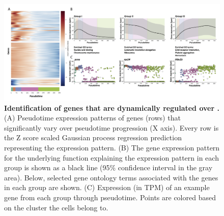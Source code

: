 \begin{figure}
    \centering
    \includegraphics[width=\textwidth]{"Figure6"}
    \caption[Identification of genes that are dynamically regulated over ]{\textbf{Identification of genes that are dynamically regulated over .} (A)	Pseudotime expression patterns of genes (rows) that significantly vary over pseudotime progression (X axis). Every row is the Z score scaled Gaussian process regression prediction representing the expression pattern. (B)	The gene expression pattern for the underlying function explaining the expression pattern in each group is shown as a black line (95\% confidence interval in the gray area). Below, selected gene ontology terms associated with the genes in each group are shown. (C)	Expression (in TPM) of an example gene from each group through pseudotime. Points are colored based on the cluster the cells belong to.}
    \label{fig:mohgp}
\end{figure}

